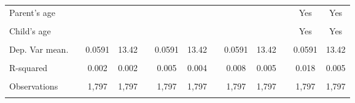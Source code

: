\begin{tabular}{rrrrrrrrrrrrr}
\multicolumn{1}{l}{Parent's age} &           &           &           &           &           &           &           &           &           &           & \multicolumn{1}{c}{Yes} & \multicolumn{1}{c}{Yes} \\
          &           &           &           &           &           &           &           &           &           &           &           &  \\
\multicolumn{1}{l}{Child's age} &           &           &           &           &           &           &           &           &           &           & \multicolumn{1}{c}{Yes} & \multicolumn{1}{c}{Yes} \\
          &           &           &           &           &           &           &           &           &           &           &           &  \\
\multicolumn{1}{l}{Dep. Var mean.} &           & \multicolumn{1}{c}{0.0591} & \multicolumn{1}{c}{13.42} &           & \multicolumn{1}{c}{0.0591} & \multicolumn{1}{c}{13.42} &           & \multicolumn{1}{c}{0.0591} & \multicolumn{1}{c}{13.42} &           & \multicolumn{1}{c}{0.0591} & \multicolumn{1}{c}{13.42} \\
          &           &           &           &           &           &           &           &           &           &           &           &  \\
\multicolumn{1}{l}{R-squared} &           & \multicolumn{1}{c}{0.002} & \multicolumn{1}{c}{0.002} &           & \multicolumn{1}{c}{0.005} & \multicolumn{1}{c}{0.004} &           & \multicolumn{1}{c}{0.008} & \multicolumn{1}{c}{0.005} &           & \multicolumn{1}{c}{0.018} & \multicolumn{1}{c}{0.005} \\
          &           &           &           &           &           &           &           &           &           &           &           &  \\
\multicolumn{1}{l}{Observations} &           & \multicolumn{1}{c}{1,797} & \multicolumn{1}{c}{1,797} &           & \multicolumn{1}{c}{1,797} & \multicolumn{1}{c}{1,797} &           & \multicolumn{1}{c}{1,797} & \multicolumn{1}{c}{1,797} &           & \multicolumn{1}{c}{1,797} & \multicolumn{1}{c}{1,797} \\
\cmidrule{1-1}\cmidrule{3-4}\cmidrule{6-7}\cmidrule{9-10}\cmidrule{12-13}          &           &           &           &           &           &           &           &           &           &           &           &  \\
\bottomrule
\end{tabular}%
